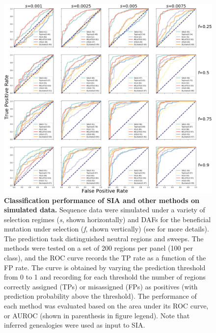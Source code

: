 \begin{figure}%
    \centering
    \includegraphics[width=\textwidth]{SIA_figs/SIA_F2.jpeg}
    \caption[Classification performance of \ac{SIA} and other methods on simulated data.]{\textbf{Classification performance of \ac{SIA} and other methods on simulated data.} Sequence data were simulated under a variety of selection regimes (\textit{s}, shown horizontally) and \acp{DAF} for the beneficial mutation under selection (\textit{f}, shown vertically) (see  for more details). The prediction task distinguished neutral regions and sweeps. The methods were tested on a set of 200 regions per panel (100 per class), and the \ac{ROC} curve records the \acf{TP} rate as a function of the \acf{FP} rate. The curve is obtained by varying the prediction threshold from 0 to 1 and recording for each threshold the number of regions correctly assigned (\acp{TP}) or misassigned (\acp{FP}) as positives (with prediction probability above the threshold). The performance of each method was evaluated based on the area under its \ac{ROC} curve, or \ac{AUROC} (shown in parenthesis in figure legend). Note that inferred genealogies were used as input to \ac{SIA}.}
    \label{fig:SIA-F2}
\end{figure}

